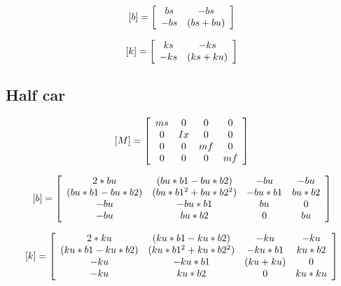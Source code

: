 \begin{equation*} \label{eq:quarter_car_b}
	[b] = \left[
		\begin{array}{c c}
		bs & -bs \\
		-bs & (bs+bu) \\
		\end{array}
	\right]
\end{equation*}

\begin{equation*} \label{eq:quarter_car_k}
	[k] = \left[
		\begin{array}{c c}
		ks & -ks \\
		-ks & (ks+ku) \\
		\end{array}
	\right]
\end{equation*}

\subsection{Half car}
\begin{equation*} \label{eq:half_car_m}
	[M] = \left[
		\begin{array}{c c c c}
		ms & 0 & 0 & 0 \\
		0 & Ix & 0 & 0 \\
		0 & 0 & mf & 0 \\
		0 & 0 & 0 & mf \\
		\end{array}
	\right]
\end{equation*}


\begin{equation*} \label{eq:half_car_b}
	[b] = \left[
		\begin{array}{c c c c}
		2*bu & (bu*b1-bu*b2) & -bu & -bu \\
		(bu*b1 - bu*b2) & (bu*b1^2 + bu*b2^2) & -bu*b1 & bu*b2 \\
		-bu & -bu*b1 & bu & 0 \\
		-bu & bu*b2 & 0 & bu \\
		\end{array}
	\right]
\end{equation*}


\begin{equation*} \label{eq:half_car_k}
	[k] = \left[
		\begin{array}{c c c c}
		2*ku & (ku*b1 - ku*b2) & -ku & -ku \\
		(ku*b1 - ku*b2) & (ku*b1^2 + ku*b2^2) & -ku*b1 & ku*b2 \\
		-ku & -ku*b1 & (ku+ku) & 0 \\
		-ku & ku*b2 & 0 & ku*ku
		\end{array}
	\right]
\end{equation*}

